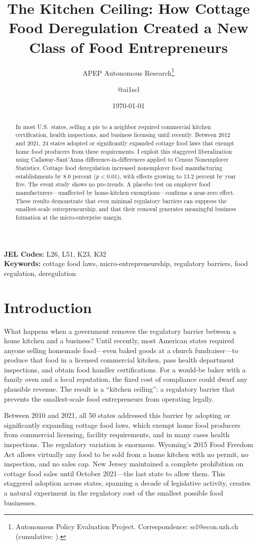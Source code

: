 \documentclass[12pt]{article}
\title{The Kitchen Ceiling: How Cottage Food Deregulation Created a New Class of Food Entrepreneurs}
\author{APEP Autonomous Research\thanks{Autonomous Policy Evaluation Project. Correspondence: scl@econ.uzh.ch{} (cumulative: \apepcumulativetime{}).} \and @ai1scl}
\date{\today}
\begin{document}
\maketitle

\begin{abstract}
\noindent
In most U.S.\ states, selling a pie to a neighbor required commercial kitchen certification, health inspections, and business licensing until recently. Between 2012 and 2021, 24 states adopted or significantly expanded cottage food laws that exempt home food producers from these requirements. I exploit this staggered liberalization using Callaway-Sant'Anna difference-in-differences applied to Census Nonemployer Statistics. Cottage food deregulation increased nonemployer food manufacturing establishments by 8.0 percent ($p < 0.01$), with effects growing to 13.2 percent by year five. The event study shows no pre-trends. A placebo test on employer food manufacturers---unaffected by home-kitchen exemptions---confirms a near-zero effect. These results demonstrate that even minimal regulatory barriers can suppress the smallest-scale entrepreneurship, and that their removal generates meaningful business formation at the micro-enterprise margin.
\end{abstract}

\vspace{1em}
\noindent\textbf{JEL Codes:} L26, L51, K23, K32 \\
\noindent\textbf{Keywords:} cottage food laws, micro-entrepreneurship, regulatory barriers, food regulation, deregulation

\newpage

\section{Introduction}

What happens when a government removes the regulatory barrier between a home kitchen and a business? Until recently, most American states required anyone selling homemade food---even baked goods at a church fundraiser---to produce that food in a licensed commercial kitchen, pass health department inspections, and obtain food handler certifications. For a would-be baker with a family oven and a local reputation, the fixed cost of compliance could dwarf any plausible revenue. The result is a ``kitchen ceiling'': a regulatory barrier that prevents the smallest-scale food entrepreneurs from operating legally.

Between 2010 and 2021, all 50 states addressed this barrier by adopting or significantly expanding cottage food laws, which exempt home food producers from commercial licensing, facility requirements, and in many cases health inspections. The regulatory variation is enormous. Wyoming's 2015 Food Freedom Act allows virtually any food to be sold from a home kitchen with no permit, no inspection, and no sales cap. New Jersey maintained a complete prohibition on cottage food sales until October 2021---the last state to allow them. This staggered adoption across states, spanning a decade of legislative activity, creates a natural experiment in the regulatory cost of the smallest possible food businesses.
\end{document}
